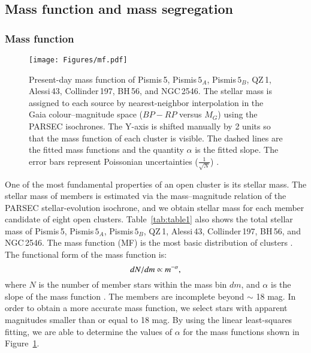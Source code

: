 \documentclass{aa} %
\begin{document}
\subsection{Mass function and mass segregation} \label{sec:mass}

\subsubsection{Mass function} \label{sec:mf}

\begin{figure}%
    \centering
    \texttt{[image: Figures/mf.pdf]}
    \caption{Present-day mass function of Pismis\,5, 
    Pismis$\,5_{A}$, Pismis$\,5_{B}$, QZ\,1, Alessi\,43, Collinder\,197, BH\,56, and NGC\,2546. The stellar mass is assigned to each source by nearest-neighbor interpolation in the Gaia colour–magnitude space ($BP-RP$ versus $M_G$) using the PARSEC isochrones. The Y-axis is shifted manually by 2 units so that the mass function of each cluster is visible. The dashed lines are the fitted mass functions and the quantity $\alpha$ is the fitted slope. The error bars represent Poissonian uncertainties ($\frac{1}{\sqrt{N}}$) \citep{2019MNRAS.482.1471B}.}
    \label{fig:mf}
    \end{figure} 


 

One of the most fundamental properties of an open cluster is its stellar mass. The stellar mass of 
members is estimated via the mass--magnitude relation of the PARSEC stellar-evolution isochrone,
and we obtain stellar mass for each member candidate of eight open clusters. Table~\ref{tab:table1} also 
shows the total stellar mass of Pismis\,5, Pismis$\,5_{A}$, Pismis$\,5_{B}$, QZ\,1, Alessi\,43, 
Collinder\,197, BH\,56, and NGC\,2546. The mass function (MF) is the most basic distribution
of clusters \citep{2019ARA&A..57..227K}. The functional form of the mass 
function is:
\begin{equation} 
    \centering
    dN/dm\propto m^{-{\alpha}},
    \end{equation}
where $N$ is the number of member stars within the mass bin $dm$, and $\alpha$ is the slope of the mass function \citep{1955ApJ...121..161S}.
The members are incomplete beyond $\sim$ 18 mag. In order to obtain a more accurate mass function, 
we select stars with apparent magnitudes smaller than or equal to 18 mag. 
By using the linear least-squares fitting, we are able to determine the values of $\alpha$ for 
the mass functions shown in Figure~\ref{fig:mf}.
\end{document}
